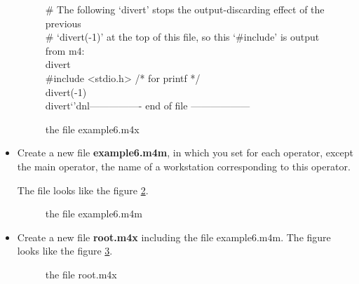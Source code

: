 \documentclass[a4paper,twoside]{report}
\begin{document}
\begin{itemize}
\begin{figure}[hbtp]
{{\# The following `divert' stops the output-discarding effect of the previous\\
\# `divert(-1)' at the top of this file, so this `\#include' is output from
m4:\\ 
divert\\ 
\#include <stdio.h> /* for printf */\\ 
divert(-1)\\
divert`'dnl---------------- end of file ------------------\\ 
}}
\label{example6_m4x}
\caption{\rm{the file example6.m4x}}
\end{figure}

\item Create a new file \textbf{example6.m4m}, in which you set for each
operator, except the main operator, the name of a workstation corresponding to
this operator.

The file looks like the figure \ref{example6_m4m}.

\begin{figure}[hbtp]
\caption{\rm{the file example6.m4m}}
\label{example6_m4m}
\end{figure}

\item Create a new file \textbf{root.m4x} including the file
example6.m4m. The figure looks like the figure \ref{root_m4x}.

\begin{figure}[hbtp]
\caption{\rm{the file root.m4x}}
\label{root_m4x}
\end{figure}


\end{itemize}
\end{document}
